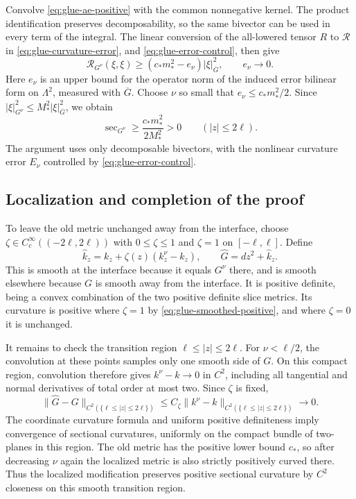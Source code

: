 \documentclass[12pt]{amsart}
\numberwithin{equation}{section}
\theoremstyle{remark}
\newcommand{\Ksec}{\operatorname{sec}}
\begin{document}
Convolve \eqref{eq:glue-ae-positive} with the common nonnegative
kernel. The product identification preserves decomposability,
so the same bivector can be used in every term of the integral.
The linear conversion of the all-lowered tensor \(R\) to
\(\mathcal R\) in \eqref{eq:glue-curvature-error}, and
\eqref{eq:glue-error-control}, then give
\[
 \mathcal R_{G^\nu}(\xi,\xi)
 \ge (c_*m_*^2-e_\nu)|\xi|_{\overline G}^2,
 \qquad e_\nu\longrightarrow0.
\]
Here \(e_\nu\) is an upper bound for the operator norm of the
induced error bilinear form on \(\Lambda^2\), measured with
\(\overline G\). Choose \(\nu\) so small that
\(e_\nu\le c_*m_*^2/2\). Since
\(|\xi|_{G^\nu}^2\le M_*^2|\xi|_{\overline G}^2\), we obtain
\begin{equation}\label{eq:glue-smoothed-positive}
 \Ksec_{G^\nu}\ge\frac{c_*m_*^2}{2M_*^2}>0
 \qquad (|z|\le2\ell).
\end{equation}
The argument uses only decomposable bivectors, with the
nonlinear curvature error \(E_\nu\) controlled by
\eqref{eq:glue-error-control}.

\subsection{Localization and completion of the proof}
To leave the old metric unchanged away from the interface,
choose \(\zeta\in C_c^\infty((-2\ell,2\ell))\) with
\(0\le\zeta\le1\) and \(\zeta=1\) on
\([-\ell,\ell]\). Define
\begin{equation}\label{eq:glue-localization}
 \widehat k_z=k_z+\zeta(z)(k_z^\nu-k_z),\qquad
 \widehat G=dz^2+\widehat k_z.
\end{equation}
This is smooth at the interface because it equals \(G^\nu\)
there, and is smooth elsewhere because \(G\) is smooth away
from the interface. It is positive definite, being a convex
combination of the two positive definite slice metrics. Its
curvature is positive where \(\zeta=1\) by
\eqref{eq:glue-smoothed-positive}, and where \(\zeta=0\) it
is unchanged.

It remains to check the transition region
\(\ell\le|z|\le2\ell\). For \(\nu<\ell/2\), the
convolution at these points samples only one smooth side of
\(G\). On this compact region, convolution therefore gives
\(k^\nu-k\to0\) in \(C^2\), including all tangential and
normal derivatives of total order at most two. Since \(\zeta\)
is fixed,
\[
 \|\widehat G-G\|_{C^2(\{\ell\le|z|\le2\ell\})}
 \le C_\zeta
       \|k^\nu-k\|_{C^2(\{\ell\le|z|\le2\ell\})}
 \longrightarrow0.
\]
The coordinate curvature formula and uniform positive
definiteness imply convergence of sectional curvatures,
uniformly on the compact bundle of two-planes in this region.
The old metric has the positive lower bound \(c_*\), so after
decreasing \(\nu\) again the localized metric is also strictly
positively curved there. Thus the localized modification
preserves positive sectional curvature by \(C^2\) closeness
on this smooth transition region.
\end{document}
